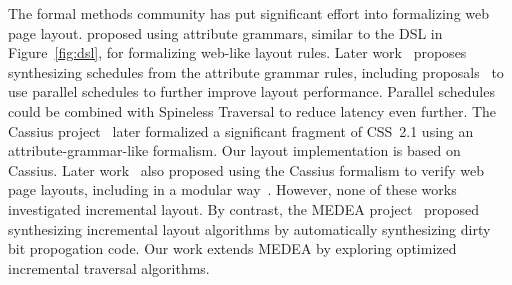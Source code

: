 The formal methods community has put significant effort
  into formalizing web page layout.
\citet{meyerovich-1} proposed using attribute grammars,
  similar to the DSL in Figure~\ref{fig:dsl},
  for formalizing web-like layout rules.
Later work~\cite{yufeng-1} proposes
  synthesizing schedules from the attribute grammar rules,
  including proposals~\cite{meyerovich-2,meyerovich-3}
  to use parallel schedules to further improve layout performance.
Parallel schedules could be combined with Spineless Traversal
  to reduce latency even further.
The Cassius project~\cite{cassius-1}
  later formalized a significant fragment of CSS~2.1
  using an attribute-grammar-like formalism.
Our layout implementation is based on Cassius.
Later work~\cite{cassius-2} also proposed
  using the Cassius formalism to verify web page layouts,
  including in a modular way~\cite{cassius-3}.
However, none of these works investigated incremental layout.
By contrast, the MEDEA project~\cite{yufeng-2}
  proposed synthesizing incremental layout algorithms
  by automatically synthesizing dirty bit propogation code.
Our work extends MEDEA by exploring
  optimized incremental traversal algorithms.
